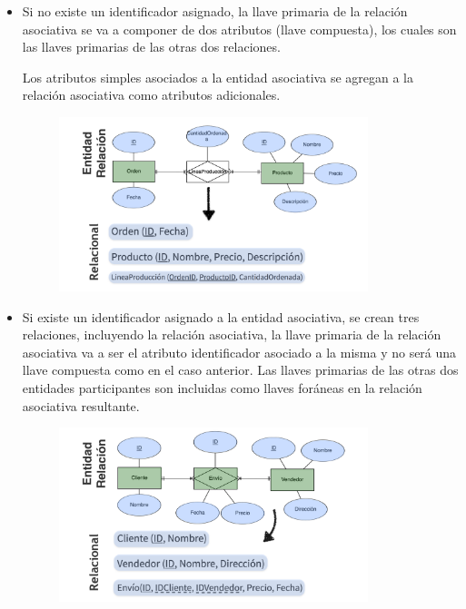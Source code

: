 \documentclass[12pt, fleqn]{report}                             %
\theoremstyle{break}                                            %
\begin{document}
                \begin{itemize}
                    \item
                        Si no existe un identificador asignado, la llave primaria de la relación asociativa
                        se va a componer de dos atributos (llave compuesta), los cuales son las llaves
                        primarias de las otras dos relaciones. 

                        Los atributos simples asociados a la entidad asociativa se agregan a la relación
                        asociativa como atributos adicionales.

                        \begin{figure}[h]
                            \centering
                            \includegraphics[width=0.85\textwidth]{MapeoEntidadesAsociativas1}
                        \end{figure}

                    \clearpage

                    \item
                        Si existe un identificador asignado a la entidad asociativa, se crean tres relaciones,
                        incluyendo la relación asociativa, la llave primaria de la relación asociativa va a ser
                        el atributo identificador asociado a la misma y no será una llave compuesta como en el
                        caso anterior. Las llaves primarias de las otras dos entidades participantes son
                        incluidas como llaves foráneas en la relación asociativa resultante.

                        \begin{figure}[h]
                            \centering
                            \includegraphics[width=0.85\textwidth]{MapeoEntidadesAsociativas2}
                        \end{figure}

                \end{itemize}
\end{document}
